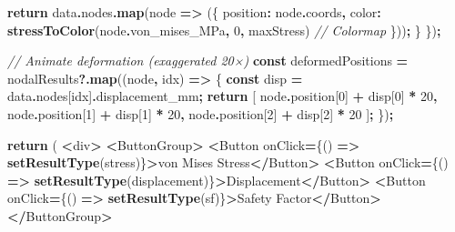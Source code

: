 \documentclass[
]{article}
\newenvironment{Shaded}{\begin{snugshade}}{\end{snugshade}}
\newcommand{\AttributeTok}[1]{\textcolor[rgb]{0.13,0.29,0.53}{#1}}
\newcommand{\CommentTok}[1]{\textcolor[rgb]{0.56,0.35,0.01}{\textit{#1}}}
\newcommand{\ControlFlowTok}[1]{\textcolor[rgb]{0.13,0.29,0.53}{\textbf{#1}}}
\newcommand{\DecValTok}[1]{\textcolor[rgb]{0.00,0.00,0.81}{#1}}
\newcommand{\FunctionTok}[1]{\textcolor[rgb]{0.13,0.29,0.53}{\textbf{#1}}}
\newcommand{\KeywordTok}[1]{\textcolor[rgb]{0.13,0.29,0.53}{\textbf{#1}}}
\newcommand{\NormalTok}[1]{#1}
\newcommand{\OperatorTok}[1]{\textcolor[rgb]{0.81,0.36,0.00}{\textbf{#1}}}
\newcommand{\StringTok}[1]{\textcolor[rgb]{0.31,0.60,0.02}{#1}}
\begin{document}
\begin{Shaded}
\begin{Highlighting}[]
      \ControlFlowTok{return}\NormalTok{ data}\OperatorTok{.}\AttributeTok{nodes}\OperatorTok{.}\FunctionTok{map}\NormalTok{(node }\KeywordTok{=\textgreater{}}\NormalTok{ (\{}
\NormalTok{        position}\OperatorTok{:}\NormalTok{ node}\OperatorTok{.}\AttributeTok{coords}\OperatorTok{,}
\NormalTok{        color}\OperatorTok{:} \FunctionTok{stressToColor}\NormalTok{(node}\OperatorTok{.}\AttributeTok{von\_mises\_MPa}\OperatorTok{,} \DecValTok{0}\OperatorTok{,}\NormalTok{ maxStress)  }\CommentTok{// Colormap}
\NormalTok{      \}))}\OperatorTok{;}
\NormalTok{    \}}
\NormalTok{  \})}\OperatorTok{;}

  \CommentTok{// Animate deformation (exaggerated 20×)}
  \KeywordTok{const}\NormalTok{ deformedPositions }\OperatorTok{=}\NormalTok{ nodalResults}\OperatorTok{?.}\FunctionTok{map}\NormalTok{((node}\OperatorTok{,}\NormalTok{ idx) }\KeywordTok{=\textgreater{}}\NormalTok{ \{}
    \KeywordTok{const}\NormalTok{ disp }\OperatorTok{=}\NormalTok{ data}\OperatorTok{.}\AttributeTok{nodes}\NormalTok{[idx]}\OperatorTok{.}\AttributeTok{displacement\_mm}\OperatorTok{;}
    \ControlFlowTok{return}\NormalTok{ [}
\NormalTok{      node}\OperatorTok{.}\AttributeTok{position}\NormalTok{[}\DecValTok{0}\NormalTok{] }\OperatorTok{+}\NormalTok{ disp[}\DecValTok{0}\NormalTok{] }\OperatorTok{*} \DecValTok{20}\OperatorTok{,}
\NormalTok{      node}\OperatorTok{.}\AttributeTok{position}\NormalTok{[}\DecValTok{1}\NormalTok{] }\OperatorTok{+}\NormalTok{ disp[}\DecValTok{1}\NormalTok{] }\OperatorTok{*} \DecValTok{20}\OperatorTok{,}
\NormalTok{      node}\OperatorTok{.}\AttributeTok{position}\NormalTok{[}\DecValTok{2}\NormalTok{] }\OperatorTok{+}\NormalTok{ disp[}\DecValTok{2}\NormalTok{] }\OperatorTok{*} \DecValTok{20}
\NormalTok{    ]}\OperatorTok{;}
\NormalTok{  \})}\OperatorTok{;}

  \ControlFlowTok{return}\NormalTok{ (}
    \OperatorTok{\textless{}}\NormalTok{div}\OperatorTok{\textgreater{}}
      \OperatorTok{\textless{}}\NormalTok{ButtonGroup}\OperatorTok{\textgreater{}}
        \OperatorTok{\textless{}}\NormalTok{Button onClick}\OperatorTok{=}\NormalTok{\{() }\KeywordTok{=\textgreater{}} \FunctionTok{setResultType}\NormalTok{(}\StringTok{\textquotesingle{}stress\textquotesingle{}}\NormalTok{)\}}\OperatorTok{\textgreater{}}\NormalTok{von Mises Stress}\OperatorTok{\textless{}/}\NormalTok{Button}\OperatorTok{\textgreater{}}
        \OperatorTok{\textless{}}\NormalTok{Button onClick}\OperatorTok{=}\NormalTok{\{() }\KeywordTok{=\textgreater{}} \FunctionTok{setResultType}\NormalTok{(}\StringTok{\textquotesingle{}displacement\textquotesingle{}}\NormalTok{)\}}\OperatorTok{\textgreater{}}\NormalTok{Displacement}\OperatorTok{\textless{}/}\NormalTok{Button}\OperatorTok{\textgreater{}}
        \OperatorTok{\textless{}}\NormalTok{Button onClick}\OperatorTok{=}\NormalTok{\{() }\KeywordTok{=\textgreater{}} \FunctionTok{setResultType}\NormalTok{(}\StringTok{\textquotesingle{}sf\textquotesingle{}}\NormalTok{)\}}\OperatorTok{\textgreater{}}\NormalTok{Safety Factor}\OperatorTok{\textless{}/}\NormalTok{Button}\OperatorTok{\textgreater{}}
      \OperatorTok{\textless{}/}\NormalTok{ButtonGroup}\OperatorTok{\textgreater{}}


\end{Highlighting}
\end{Shaded}
\end{document}
